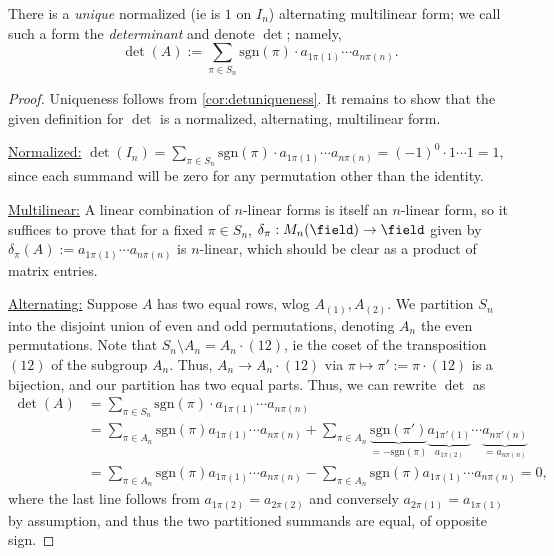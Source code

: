 \begin{theorem}\label{thm:determinant}
    There is a \emph{unique} normalized (ie is $1$ on $I_n$) alternating multilinear form; we call such a form the \emph{determinant} and denote $\det$; namely, \[
    \det(A):= \sum_{\pi \in S_n}  \text{sgn}(\pi) \cdot a_{1 \pi(1)} \cdots a_{n \pi(n)}.
    \]
\end{theorem}
\begin{proof}
    Uniqueness follows from \cref{cor:detuniqueness}. It remains to show that the given definition for $\det$ is a normalized, alternating, multilinear form.
    
    \underline{Normalized:} $\det(I_n) = \sum_{ \pi \in S_n} \text{sgn}(\pi) \cdot a_{1 \pi(1)} \cdots a_{n \pi(n)} =(-1)^0 \cdot  1 \cdots 1 = 1$, since each summand will be zero for any permutation other than the identity.

    \underline{Multilinear:} A linear combination of $n$-linear forms is itself an $n$-linear form, so it suffices to prove that for a fixed $\pi \in S_n$, $\delta_\pi : M_n(\field) \to \field$ given by $\delta_\pi (A) := a_{1 \pi(1)} \cdots a_{n \pi (n)}$ is $n$-linear, which should be clear as a product of matrix entries.

    \underline{Alternating:} Suppose $A$ has two equal rows, wlog $A_{(1)}, A_{(2)}$. We partition $S_n$ into the disjoint union of even and odd permutations, denoting $A_n$ the even permutations. Note that $S_n \setminus A_n = A_n \cdot (12)$, ie the coset of the transposition $(12)$ of the subgroup $A_n$. Thus, $A_n \to A_n \cdot (12)$ via $\pi \mapsto \pi' := \pi \cdot (12)$ is a bijection, and our partition has two equal parts. Thus, we can rewrite $\det$ as \begin{align*}
        \det(A) &=\sum_{\pi \in S_n}  \text{sgn}(\pi) \cdot a_{1 \pi(1)} \cdots a_{n \pi(n)} \\
        &= \sum_{\pi \in A_n} \text{sgn}(\pi) a_{1 \pi(1)} \cdots a_{n\pi(n)} + \sum_{\pi \in A_n} \underbrace{\text{sgn}(\pi')}_{=- \text{sgn}(\pi)} \underbrace{a_{1 \pi'(1)}}_{a_{1 \pi(2)}}\cdots \underbrace{a_{n\pi'(n)}}_{= a_{n \pi(n)}}\\
        &= \sum_{\pi \in A_n} \text{sgn}(\pi) a_{1 \pi(1)} \cdots a_{n\pi(n)} - \sum_{\pi \in A_n} \text{sgn}(\pi) a_{1 \pi(1)} \cdots a_{n\pi(n)} = 0,
    \end{align*}
    where the last line follows from $a_{1 \pi(2)} = a_{2 \pi(2)}$ and conversely $a_{2 \pi(1)} = a_{1 \pi(1)}$ by assumption, and thus the two partitioned summands are equal, of opposite sign.
\end{proof}

